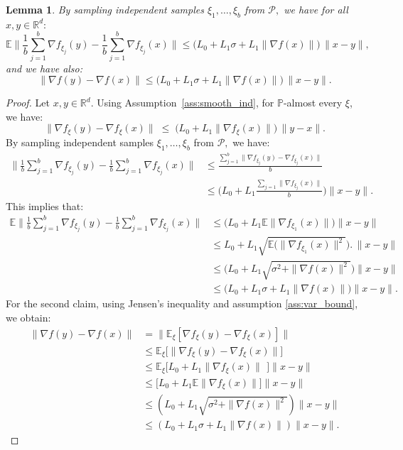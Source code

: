 \documentclass[twoside]{article}
\theoremstyle{plain}
\newtheorem{lemma}{Lemma}[section]
\theoremstyle{definition}
\theoremstyle{remark}
\begin{document}
\begin{propbox}
\begin{lemma}\label{Lemma:sampling}
By sampling independent samples $\xi_1,\ldots,\xi_b$ from $\mathcal{P},$ we have for all $x,y \in \mathbb{R}^d:$    $$\mathbb{E}\lVert \frac{1}{b}\sum_{j=1}^b \nabla f_{\xi_j}(y) -\frac{1}{b}\sum_{j=1}^b \nabla f_{\xi_j}(x)\rVert\le  \big( L_0+L_1\sigma +L_1 \| \nabla f(x)\| \big)\,\|x-y \|,$$
and we have also:
 $$\lVert \nabla f(y) - \nabla f(x)\rVert\le \big( L_0+L_1\sigma +L_1 \| \nabla f(x)\|\big)\, \|x-y \|.$$
\end{lemma}
\end{propbox}
\begin{proof}
Let $x,y \in \mathbb{R}^d$. Using Assumption~\ref{ass:smooth_ind}, for $\mathbb{P}$-almost every $\xi$, we have:
\begin{equation*}
\|\nabla f_{\xi}(y)-\nabla f_{\xi}(x)\|
\;\le\;
\big(L_0+L_1\|\nabla f_{\xi}(x)\|\big)\,\|y-x\|.
\end{equation*}
By sampling independent samples $\xi_1,\ldots,\xi_b$ from $\mathcal{P},$ we have:
\begin{align*}
\lVert \frac{1}{b}\sum_{j=1}^b \nabla f_{\xi_j}(y) -\frac{1}{b}\sum_{j=1}^b \nabla f_{\xi_j}(x)\rVert&\le \frac{\sum_{j=1}^b  \lVert \nabla f_{\xi_j}(y) - \nabla f_{\xi_j}(x)\rVert}{b} \\
&\le \bigg( L_0+L_1 \frac{ \sum_{j=1}\|\nabla f_{\xi_j}(x)\| }{b} \bigg) \|x-y \|.
\end{align*}
This implies that:
\begin{align*}
\mathbb{E}\lVert \frac{1}{b}\sum_{j=1}^b \nabla f_{\xi_j}(y) -\frac{1}{b}\sum_{j=1}^b \nabla f_{\xi_j}(x)\rVert &\le \big(L_0+L_1\mathbb{E}\|\nabla f_{\xi_1}(x)\|\big) \|x-y \|\\
&\le L_0+L_1\sqrt{\mathbb{E} \big(\|\nabla f_{\xi_1}(x)\|^2}\big)  .\, \|x-y \|\\
&\le \big(L_0+L_1\sqrt{\sigma^2+ \|\nabla f(x)\|^2 } \big) \|x-y \|\\
&\le \big( L_0+L_1\sigma +L_1 \| \nabla f(x)\|\big)\|x-y \|.
\end{align*}
For the second claim,
using Jensen’s inequality and assumption \ref{ass:var_bound}, we obtain:
\begin{align*}
\|\nabla f(y)-\nabla f(x)\|
&= \big\|\mathbb{E}_{\xi}[\nabla f_{\xi}(y)-\nabla f_{\xi}(x)]\big\|  \\
&\le \mathbb{E}_{\xi}\big[\|\nabla f_{\xi}(y)-\nabla f_{\xi}(x)\|\big] \\
&\le \mathbb{E}_{\xi}\!\Big[L_0+L_1\|\nabla f_{\xi}(x)\|\  \,\Big] \|x-y \|  \\
&\le \Big[L_0+L_1 \mathbb{E}\|\nabla f_{\xi}(x)\|  \Big] \|x-y \| \\
&\le\!\left(L_0 + L_1\sqrt{\sigma^2+\|\nabla f(x)\|^2}\right) \|x-y \| \\
&\le \!\left(L_0 +L_1\sigma + L_1\|\nabla f(x)\|\right) \|x-y \|.
\end{align*}

\end{proof}
\end{document}
